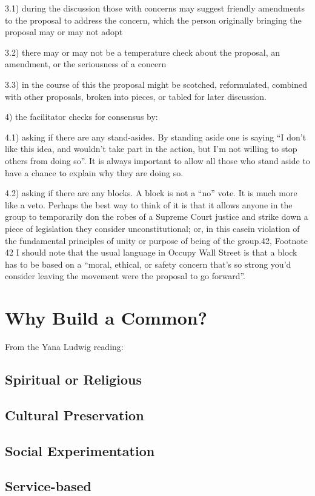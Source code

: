 \documentclass{article}
\begin{document}
3.1) during the discussion those with concerns may suggest friendly amendments to the proposal to address the concern, which the person originally bringing the proposal may or may not adopt

3.2) there may or may not be a temperature check about the proposal, an amendment, or the seriousness of a concern

3.3) in the course of this the proposal might be scotched, reformulated, combined with other proposals, broken into pieces, or tabled for later discussion.

4) the facilitator checks for consensus by:

4.1) asking if there are any stand-asides. By standing aside one is saying “I don’t like this idea, and wouldn’t take part in the action, but I’m not willing to stop others from doing so”. It is always important to allow all those who stand aside to have a chance to explain why they are doing so.

4.2) asking if there are any blocks. A block is not a “no” vote. It is much more like a veto. Perhaps the best way to think of it is that it allows anyone in the group to temporarily don the robes of a Supreme Court justice and strike down a piece of legislation they consider unconstitutional; or, in this casein violation of the fundamental principles of unity or purpose of being of the group.{42},
Footnote {42} I should note that the usual language in Occupy Wall Street is that a block has to be based on a “moral, ethical, or safety concern that’s so strong you’d consider leaving the movement were the proposal to go forward”.

\pagebreak
\section{Why Build a Common?}

From the Yana Ludwig reading:

\subsection{Spiritual or Religious}
\subsection{Cultural Preservation}
\subsection{Social Experimentation}
\subsection{Service-based}
\end{document}
